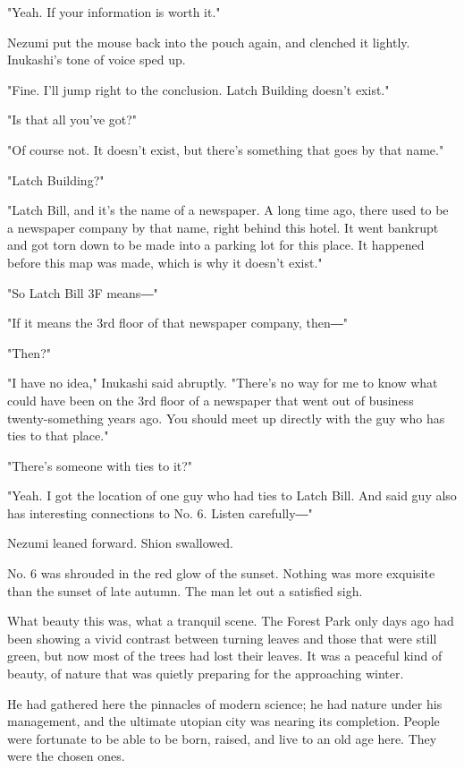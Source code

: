 "Yeah. If your information is worth it."

Nezumi put the mouse back into the pouch again, and clenched it lightly.
Inukashi's tone of voice sped up.

"Fine. I'll jump right to the conclusion. Latch Building doesn't exist."

"Is that all you've got?"

"Of course not. It doesn't exist, but there's something that goes by
that name."

"Latch Building?"

"Latch Bill, and it's the name of a newspaper. A long time ago, there
used to be a newspaper company by that name, right behind this hotel. It
went bankrupt and got torn down to be made into a parking lot for this
place. It happened before this map was made, which is why it doesn't
exist."

"So Latch Bill 3F means―"

"If it means the 3rd floor of that newspaper company, then―"

"Then?"

"I have no idea," Inukashi said abruptly. "There's no way for me to know
what could have been on the 3rd floor of a newspaper that went out of
business twenty-something years ago. You should meet up directly with
the guy who has ties to that place."

"There's someone with ties to it?"

"Yeah. I got the location of one guy who had ties to Latch Bill. And
said guy also has interesting connections to No. 6. Listen carefully―"

Nezumi leaned forward. Shion swallowed.

\mybreak

No. 6 was shrouded in the red glow of the sunset. Nothing was more
exquisite than the sunset of late autumn. The man let out a satisfied
sigh.

What beauty this was, what a tranquil scene. The Forest Park only days
ago had been showing a vivid contrast between turning leaves and those
that were still green, but now most of the trees had lost their leaves.
It was a peaceful kind of beauty, of nature that was quietly preparing
for the approaching winter.

He had gathered here the pinnacles of modern science; he had nature
under his management, and the ultimate utopian city was nearing its
completion. People were fortunate to be able to be born, raised, and
live to an old age here. They were the chosen ones.

